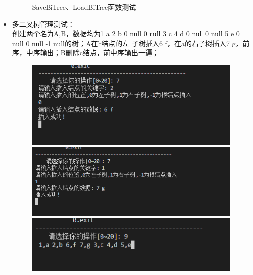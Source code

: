 \documentclass[supercite]{Experimental_Report}
\theoremstyle{definition}
\begin{document}
\begin{itemize}
\begin{figure}[htbp]
\begin{minipage}{0.9\linewidth}
		      \end{minipage}
		      \caption{SaveBiTree、LoadBiTree函数测试}
		      \label{fig2-20}
	      \end{figure}
	      \newpage
	\item 多二叉树管理测试：\\创建两个名为A,B，数据均为1 a 2 b 0 null  0 null 3 c 4 d  0 null  0 null 5 e  0 null  0 null -1 null的树；A在b结点的左
	      子树插入6 f，在a的右子树插入7 g，前序，中序输出；B删除c结点，前中序输出一遍；
	      \begin{figure}[htbp]
		      \centering
		      \begin{minipage}{0.9\linewidth}
			      \centering
			      \includegraphics[width=0.9\linewidth]{images/test-102.png}
		      \end{minipage}
		      \begin{minipage}{0.9\linewidth}
			      \centering
			      \includegraphics[width=0.9\linewidth]{images/test-103.png}
		      \end{minipage}
		      \begin{minipage}{0.9\linewidth}
			      \centering
			      \includegraphics[width=0.9\linewidth]{images/test-104.png}
		      \end{minipage}
	      \end{figure}

\end{itemize}
\end{document}
